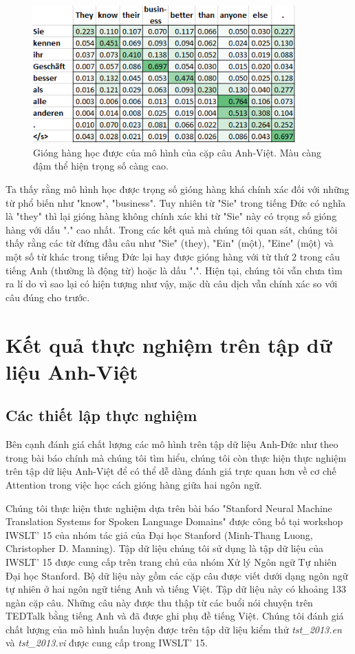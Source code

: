 \begin{figure}
	\centering
	\includegraphics[width=0.9\textwidth]{en-de_attn-weights_31.png}
	\caption[Gióng hàng học được của mô hình của cặp câu Anh-Việt.]{Gióng hàng học được của mô hình của cặp câu Anh-Việt. Màu càng đậm thể hiện trọng số càng cao.}
	\label{fig_en-de_attn-weights_31}
\end{figure}

Ta thấy rằng mô hình học được trọng số gióng hàng khá chính xác đối với những từ phổ biến như "know", "business". Tuy nhiên từ "Sie" trong tiếng Đức có nghĩa là "they" thì lại gióng hàng không chính xác khi từ "Sie" này có trọng số gióng hàng với dấu "." cao nhất. Trong các kết quả mà chúng tôi quan sát, chúng tôi thấy rằng các từ đứng đầu câu như "Sie" (they), "Ein" (một), "Eine" (một) và một số từ khác trong tiếng Đức lại hay được gióng hàng với từ thứ 2 trong câu tiếng Anh (thường là động từ) hoặc là dấu ".". Hiện tại, chúng tôi vẫn chưa tìm ra lí do vì sao lại có hiện tượng như vậy, mặc dù câu dịch vẫn chính xác so với câu đúng cho trước.

\section{Kết quả thực nghiệm trên tập dữ liệu Anh-Việt}
\subsection{Các thiết lập thực nghiệm}
Bên cạnh đánh giá chất lượng các mô hình trên tập dữ liệu Anh-Đức như theo trong bài báo chính mà chúng tôi tìm hiểu, chúng tôi còn thực hiện thực nghiệm trên tập dữ liệu Anh-Việt để có thể dễ dàng đánh giá trực quan hơn về cơ chế Attention trong việc học cách gióng hàng giữa hai ngôn ngữ.

Chúng tôi thực hiện thưc nghiệm dựa trên bài báo "Stanford Neural Machine Translation Systems for Spoken Language Domains" \cite{AnhVietpaper} được công bố tại workshop IWSLT' 15 của nhóm tác giả của Đại học Stanford (Minh-Thang Luong, Christopher D. Manning). Tập dữ liệu chúng tôi sử dụng là tập dữ liệu của IWSLT' 15 được cung cấp trên trang chủ của nhóm Xử lý Ngôn ngữ Tự nhiên Đại học Stanford. Bộ dữ liệu này gồm các cặp câu được viết dưới dạng ngôn ngữ tự nhiên ở hai ngôn ngữ tiếng Anh và tiếng Việt. Tập dữ liệu này có khoảng 133 ngàn cặp câu. Những câu này được thu thập từ các buổi nói chuyện trên TEDTalk bằng tiếng Anh và đã được ghi phụ đề tiếng Việt. Chúng tôi đánh giá chất lượng của mô hình huấn luyện được trên tập dữ liệu kiểm thử \textit{tst\_2013.en} và \textit{tst\_2013.vi} được cung cấp trong IWSLT' 15.

